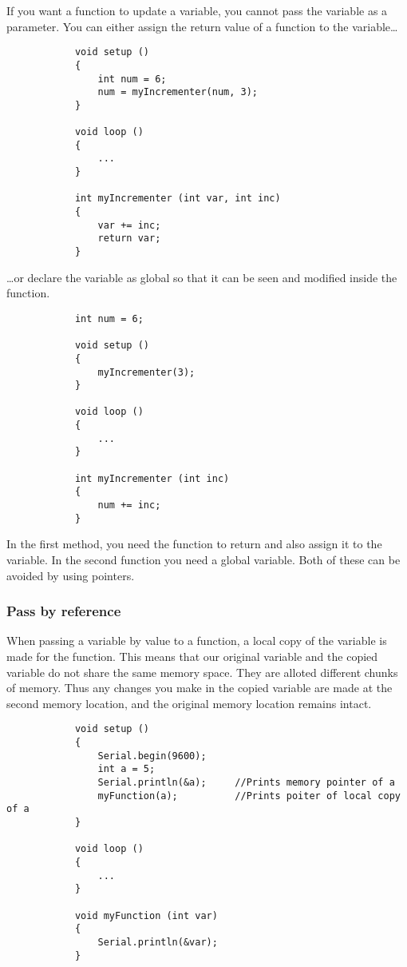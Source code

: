 \documentclass{article}
\begin{document}
			If you want a function to update a variable, you cannot pass the variable as a parameter. You can either assign the return value of a function to the variable\ldots

			\begin{lstlisting}
			void setup ()
			{
				int num = 6;
				num = myIncrementer(num, 3);
			}

			void loop ()
			{
				...
			}

			int myIncrementer (int var, int inc)
			{
				var += inc;
				return var;
			}
			\end{lstlisting}

			\ldots{}or declare the variable as global so that it can be seen and modified inside the function.

			\begin{lstlisting}
			int num = 6;
			
			void setup ()
			{
				myIncrementer(3);
			}

			void loop ()
			{
				...
			}

			int myIncrementer (int inc)
			{
				num += inc;
			}
			\end{lstlisting}

			In the first method, you need the function to return and also assign it to the variable. In the second function you need a global variable. Both of these can be avoided by using pointers.

		\subsubsection{Pass by reference}

			When passing a variable by value to a function, a local copy of the variable is made for the function. This means that our original variable and the copied variable do not share the same memory space. They are alloted different chunks of memory. Thus any changes you make in the copied variable are made at the second memory location, and the original memory location remains intact.

			\begin{lstlisting}
			void setup ()
			{
				Serial.begin(9600);
				int a = 5;
				Serial.println(&a);		//Prints memory pointer of a
				myFunction(a);			//Prints poiter of local copy of a
			}

			void loop ()
			{
				...
			}

			void myFunction (int var)
			{
				Serial.println(&var);
			}
			\end{lstlisting}
\end{document}
